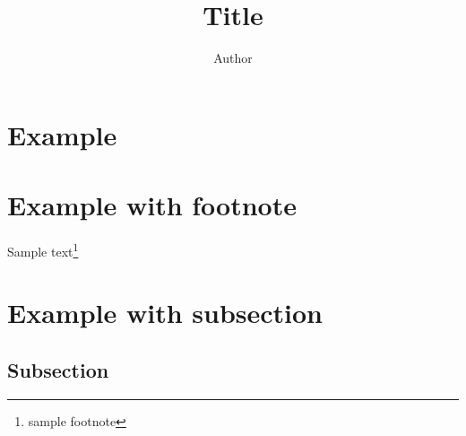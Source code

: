\documentclass{article}
\title{Title}
\author{Author}
\date{}
\begin{document}
\maketitle

\section*{Example} %
\lipsum
\par \lipsum

\section*{Example with footnote}
Sample text\footnote{\tiny sample footnote}

\section*{Example with subsection}
\lipsum    
  \subsection*{Subsection}
    \lipsum
    
% 

\end{document}
